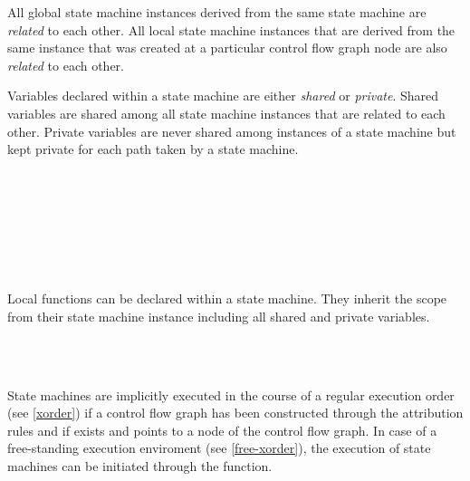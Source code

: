 All global state machine instances derived from the same state machine are
\textit{related} to each other. All local
state machine instances that are derived from the same instance that was
created at a particular control flow graph node are also \textit{related}
to each other.

Variables declared within a state machine are
either \textit{shared} or
\textit{private}. Shared variables are shared
among all state machine instances that are related to each other.
Private variables are never shared among instances of a state machine
but kept private for each path taken by a state machine.

\begin{grammar}
      \produces {} \\
      \produces {} \\
      \produces {}
	  \\
      \produces {}   \\
      \produces {} 
	 \lextoken{=}  \\
      \produces {} 
	  \\
      \produces {} 
	  \lextoken{=} 
\end{grammar}

\noindent
Local functions can be declared within a state machine.\label{sm-localfun}
They inherit the scope from their state machine instance including all shared and
private variables.

\begin{grammar}
      \produces {} \\
      \produces {} \\
      \produces {}
\end{grammar}

\noindent
State machines are implicitly executed in the course of a regular
execution order (see \ref{xorder}) if a control flow graph has been constructed through the attribution rules and if
 exists and points to a node of the
control flow graph. In case of a free-standing execution enviroment
(see \ref{free-xorder}), the execution of state machines can be
initiated through the  function.

